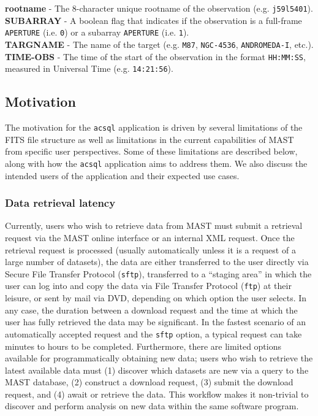 \documentclass[10pt,journal,compsoc]{IEEEtran}
\begin{document}
\noindent\textbf{rootname} - The 8-character unique rootname of the observation (e.g. \texttt{j59l5401}).\\

\noindent\textbf{SUBARRAY} - A boolean flag that indicates if the observation is a full-frame \texttt{APERTURE} (i.e. \texttt{0}) or a subarray \texttt{APERTURE} (i.e. \texttt{1}).\\

\noindent\textbf{TARGNAME} - The name of the target (e.g. \texttt{M87}, \texttt{NGC-4536}, \texttt{ANDROMEDA-I}, etc.).\\

\noindent\textbf{TIME-OBS} - The time of the start of the observation in the format \texttt{HH:MM:SS}, measured in Universal Time (e.g. \texttt{14:21:56}).\\


\subsection{Motivation} \label{sec1.3}

The motivation for the \texttt{acsql} application is driven by several limitations of the FITS file structure as well as limitations in the current capabilities of
MAST from specific user perspectives. Some of these limitations are described below, along with how the \texttt{acsql} application aims to address them.  We also
discuss the intended users of the application and their expected use cases.


\subsubsection{Data retrieval latency} \label{sec1.3.1}

Currently, users who wish to retrieve data from MAST must submit a retrieval request via the MAST online interface or an internal XML request. Once the retrieval
request is processed (usually automatically unless it is a request of a large number of datasets), the data are either transferred to the user directly via
Secure File Transfer Protocol (\texttt{sftp}), transferred to a ``staging area'' in which the user can log into and copy the data via File Transfer Protocol (\texttt{ftp})
at their leisure, or sent by mail via DVD, depending on which option the user selects.  In any case, the duration between a download request and the time at which the
user has fully retrieved the data may be significant.  In the fastest scenario of an automatically accepted request and the \texttt{sftp} option, a
typical request can take minutes to hours to be completed. Furthermore, there are limited options available for programmatically obtaining new data; users who wish to
retrieve the latest available data must (1) discover which datasets are new via a query to the MAST database, (2) construct a download request, (3) submit the download
request, and (4) await or retrieve the data.  This workflow makes it non-trivial to discover and perform analysis on new data within the same software program.
\end{document}
